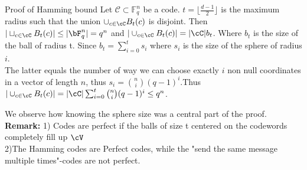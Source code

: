 \begin{frame}{Proof of Hamming bound}
Let \(\mathcal{C} \subset \mathbb{F}_q^n\) be a code. \pause \(t = \lfloor \frac{d-1}{2}\rfloor\) is the maximum radius such that the union \(\cup_{c \in \cC}B_t(c)\) is disjoint. 
\pause Then \(|\sqcup_{c \in \cC}B_t(c)|\leq |\bF_q^n|=q^n\) and \pause \(|\cup_{c \in \cC}B_t(c)| = |\cC|b_t\). Where \(b_t\) is the size of the ball of radius t. \pause Since \(b_t = \sum_{i=0}^ts_i\) where \(s_i\) is the size of the sphere of radius \(i\). \\ \pause The latter equals the number of way we can choose exactly \(i\) non null coordinates in a vector of length \(n\), thus \(s_i = \binom{n}{i}(q-1)^i\).\pause Thus \(|\cup_{c \in \cC}B_t(c)| = |\cC|\sum_{i=0}^t \binom{n}{i}(q-1)^i \leq q^n \). 


\vspace{1cm}
We observe how knowing the sphere size was a central part of the proof. \\ \pause
\vspace{1cm}
\textbf{Remark:} 1) Codes are perfect if the balls of size t centered on the codewords completely fill up \(\cV\) \\2)The Hamming codes are Perfect codes, while the "send the same message multiple times"-codes are not perfect.

\end{frame}



